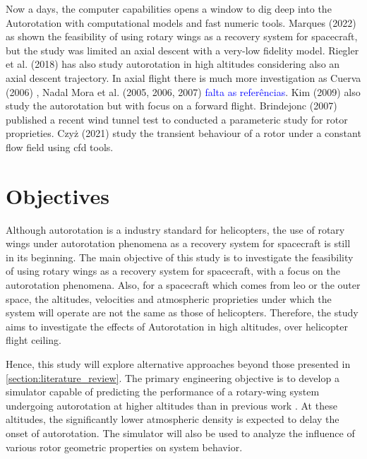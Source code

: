 Now a days, the computer capabilities opens a window to dig deep into the Autorotation with computational models and fast numeric tools. Marques (2022) \cite{marques_design_2024} as shown the feasibility of using rotary wings as a recovery system for spacecraft, but the study was limited an axial descent with a very-low fidelity model. Riegler et al. (2018) \cite{riegler_daedalus_2018} has also study autorotation in high altitudes considering also an axial descent trajectory. In axial flight there is much more investigation as Cuerva (2006) \cite{cuerva_engineering_2006} , Nadal Mora et al. (2005, 2006, 2007) \textcolor{blue}{falta as referências}. Kim (2009) \cite{kim_v_2009} also study the autorotation but with focus on a forward flight. Brindejonc (2007) \cite{brindejonc_design_2007} published a recent wind tunnel test to conducted a parameteric study for rotor proprieties. Czyż (2021) \cite{czyz_v_2021} study the transient behaviour of a rotor under a constant flow field using \gls{cfd} tools.

\section{Objectives}
\label{section:objectives}

Although autorotation is a industry standard for helicopters, the use of rotary wings under autorotation phenomena as a recovery system for spacecraft is still in its beginning. The main objective of this study is to investigate the feasibility of using rotary wings as a recovery system for spacecraft, with a focus on the autorotation phenomena. Also, for a spacecraft which comes from \gls{leo} or the outer space, the altitudes, velocities and atmospheric proprieties under which the system will operate are not the same as those of helicopters. Therefore, the study aims to investigate the effects of Autorotation in high altitudes, over helicopter flight ceiling.

Hence, this study will explore alternative approaches beyond those presented in \ref{section:literature_review}. The primary engineering objective is to develop a simulator capable of predicting the performance of a rotary-wing system undergoing autorotation at higher altitudes than in previous work \cite{marques_design_2024}. At these altitudes, the significantly lower atmospheric density is expected to delay the onset of autorotation. The simulator will also be used to analyze the influence of various rotor geometric properties on system behavior.

